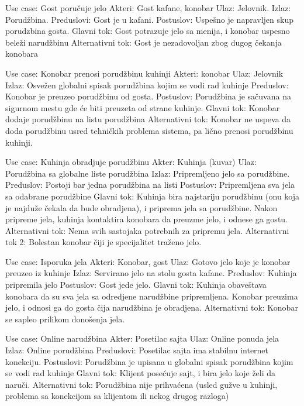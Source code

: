 \documentclass{article}
\begin{document}
Use case: Gost poručuje jelo
Akteri: Gost kafane, konobar
Ulaz: Jelovnik.
Izlaz: Porudžbina.
Preduslovi: Gost je u kafani.
Postuslov: Uspešno je napravljen skup porudzbina gosta.
Glavni tok: Gost potrazuje jelo sa menija, i konobar uspesno beleži narudžbinu
Alternativni tok: Gost je nezadovoljan zbog dugog čekanja konobara

Use case: Konobar prenosi porudžbinu kuhinji
Akteri: konobar
Ulaz: Jelovnik
Izlaz: Osvežen globalni spisak porudžbina kojim se vodi rad kuhinje
Preduslov: Konobar je preuzeo porudžbinu od gosta.
Postuslov: Porudžbina je sačuvana na sigurnom mestu gde će biti preuzeta od strane kuhinje.
Glavni tok: Konobar dodaje porudžbinu na listu porudžbina
Alternativni tok: Konobar ne uspeva da doda porudžbinu usred tehničkih problema sistema, pa lično prenosi porudžbinu kuhinji.

Use case: Kuhinja obradjuje porudžbinu
Akter: Kuhinja (kuvar)
Ulaz: Porudžbina sa globalne liste porudžbina
Izlaz: Pripremljeno jelo sa porudžbine.
Preduslov: Postoji bar jedna porudžbina na listi
Postuslov: Pripremljena sva jela sa odabrane porudžbine
Glavni tok: Kuhinja bira najstariju porudžbinu (onu koja je najduže čekala da bude obradjena), i priprema jela sa porudžbine. Nakon pripreme jela, kuhinja kontaktira konobara da preuzme jelo, i odnese ga gostu.
Alternativni tok: Nema svih sastojaka potrebnih za pripremu jela.
Alternativni tok 2: Bolestan konobar čiji je specijalitet traženo jelo.

Use case: Isporuka jela
Akteri: Konobar, gost
Ulaz: Gotovo jelo koje je konobar preuzeo iz kuhinje
Izlaz: Servirano jelo na stolu gosta kafane.
Preduslov: Kuhinja pripremila jelo
Postuslov: Gost jede jelo.
Glavni tok: Kuhinja obaveštava konobara da su sva jela sa odredjene narudžbine pripremljena. Konobar preuzima jelo, i odnosi ga do gosta čija narudžbina je obradjena.
Alternativni tok: Konobar se sapleo prilikom donošenja jela.

Use case: Online narudžbina
Akter: Posetilac sajta
Ulaz: Online ponuda jela
Izlaz: Online porudžbina
Preduslovi: Posetilac sajta ima stabilnu internet konekciju.
Postuslovi: Porudžbina je upisana u globalni spisak porudžbina kojim se vodi rad kuhinje
Glavni tok: Klijent posećuje sajt, i bira jelo koje želi da naruči.
Alternativni tok: Porudžbina nije prihvaćena (usled gužve u kuhinji, problema sa konekcijom sa klijentom ili nekog drugog razloga)
\end{document}
